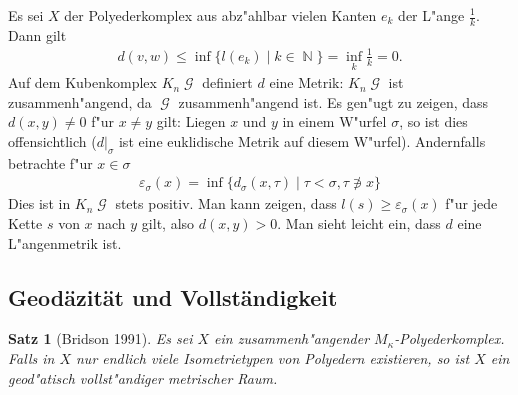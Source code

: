 \documentclass[paper=A4, twoside, chapterprefix=true, bibliography=totoc, headsepline]{scrbook}
\let\temp\phi
\let\phi\varphi
\let\varphi\temp
\let\temp\theta
\let\theta\vartheta
\let\vartheta\temp
\let\temp\epsilon
\let\epsilon\varepsilon
\let\varepsilon\temp
\let\temp\rho
\let\rho\varrho
\let\varrho\temp
\DeclareMathOperator{\N}{\mathbb{N}}
\DeclareMathOperator{\calG}{{\mathcal{G}}}
\newcommand{\G}{\calG}
\theoremstyle{nonumberbreak}
\newtheorem{satz}{Satz}
\theoremstyle{emptybreak}
\theoremstyle{break}
\begin{document}
Es sei $X$ der Polyederkomplex aus abz"ahlbar vielen Kanten $e_k$ der L"ange $\frac{1}{k}$.
Dann gilt
\begin{align*}
	d(v, w) \le \inf \{ l(e_k) \mid k \in \N \} = \inf_k \frac{1}{k} = 0.
\end{align*}
Auf dem Kubenkomplex $K_n\G$ definiert $d$ eine Metrik:
$K_n\G$ ist zusammenh"angend, da $\G$ zusammenh"angend ist.
Es gen"ugt zu zeigen, dass $d(x,y) \ne 0$ f"ur $x \ne y$ gilt:
Liegen $x$ und $y$ in einem W"urfel $\sigma$, so ist dies offensichtlich ($d|_\sigma$ ist eine euklidische Metrik auf diesem W"urfel).
Andernfalls betrachte f"ur $x \in \sigma$
\begin{align*}
	\epsilon_\sigma(x) = \inf \{ d_\sigma(x, \tau) \mid \tau < \sigma, \tau \not\ni x \}
\end{align*}
Dies ist in $K_n\G$ stets positiv.
Man kann zeigen, dass $l(s) \ge \epsilon_\sigma(x)$ f"ur jede Kette $s$ von $x$ nach $y$ gilt, also $d(x, y) > 0$.
Man sieht leicht ein, dass $d$ eine L"angenmetrik ist.

\subsection*{Geod\"azit\"at und Vollst\"andigkeit}
\begin{satz}[Bridson 1991]
Es sei $X$ ein zusammenh"angender $M_\kappa$-Polyederkomplex.
Falls in $X$ nur endlich viele Isometrietypen von Polyedern existieren, so ist $X$ ein geod"atisch vollst"andiger metrischer Raum.
\end{satz}
\end{document}
